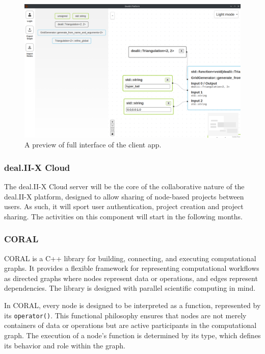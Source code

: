 \documentclass[a4paper,12pt]{article}
\begin{document}
\begin{figure}
  \centering

  \includegraphics[width=\textwidth]{dualistic-interface-preview.png}

  \caption{A preview of full interface of the client app.}
  \label{fig:dualistic-interface-preview}
\end{figure}

\subsubsection{deal.II-X Cloud}

The deal.II-X Cloud server will be the core of the collaborative nature of the deal.II-X platform, designed to allow sharing of node-based projects between users.  As such, it will sport user authentication, project creation and project sharing. The activities on this component will start in the following months.

\subsubsection{CORAL}

CORAL is a C++ library for building, connecting, and executing computational graphs. It provides a flexible framework for representing computational workflows as directed graphs where nodes represent data or operations, and edges represent dependencies. The library is designed with parallel scientific computing in mind.

In CORAL, every node is designed to be interpreted as a function, represented by its \texttt{operator()}. This functional philosophy ensures that nodes are not merely containers of data or operations but are active participants in the computational graph. The execution of a node's function is determined by its type, which defines its behavior and role within the graph.
\end{document}
